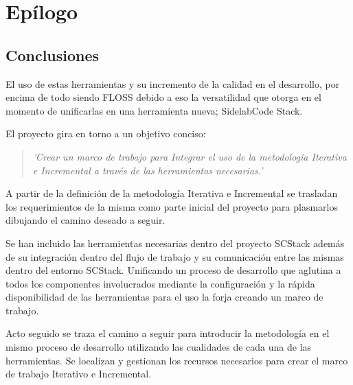 %
% 

\chapter{Ep\'ilogo}
\label{chap:epilogo}

\section{Conclusiones}
\label{sec:conclusiones}

\par El uso de estas herramientas y su incremento de la calidad en el desarrollo, por encima de todo siendo FLOSS debido a eso la versatilidad que otorga en el momento de unificarlas en una herramienta nueva; SidelabCode Stack.

\par El proyecto gira en torno a un objetivo conciso:

\begin{quote}
    \emph{'Crear un marco de trabajo para Integrar el uso de la metodología Iterativa e Incremental a través de las herramientas necesarias.'}
\end{quote}

\par A partir de la definición de la metodología Iterativa e Incremental se trasladan los requerimientos de la misma como parte inicial del proyecto para plasmarlos dibujando el camino deseado a seguir.

\par Se han incluido las herramientas necesarias dentro del proyecto SCStack además de su integración dentro del flujo de trabajo y su comunicación entre las mismas dentro del entorno SCStack. Unificando un proceso de desarrollo que aglutina a todos los componentes involucrados mediante la configuración y la rápida disponibilidad de las herramientas para el uso la forja creando un marco de trabajo.

\par Acto seguido se traza el camino a seguir para introducir la metodología en el mismo proceso de desarrollo utilizando las cualidades de cada una de las herramientas. Se localizan y gestionan los recursos necesarios para crear el marco de trabajo Iterativo e Incremental.

